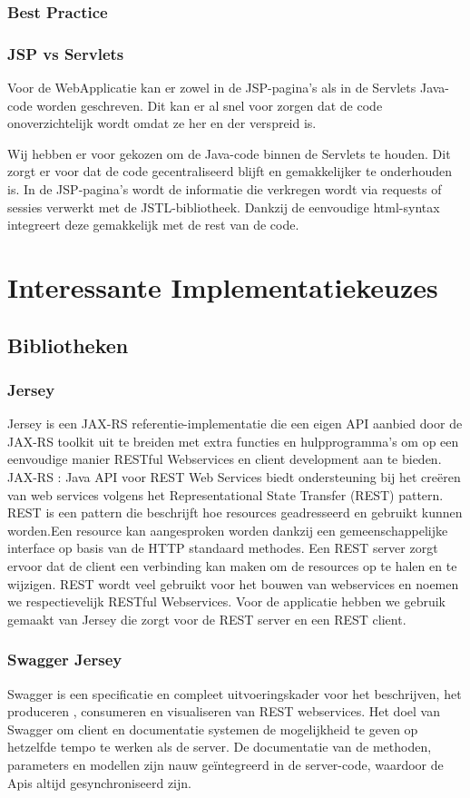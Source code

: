 \documentclass[pdftex,a4paper,12pt,twoside]{report}
\begin{document}
\subsection{Best Practice}
\subsection{JSP vs Servlets}
Voor de WebApplicatie kan er zowel in de JSP-pagina's als in de Servlets Java-code worden geschreven. Dit kan er al snel voor zorgen dat de code onoverzichtelijk wordt omdat ze her en der verspreid is.

Wij hebben er voor gekozen om de Java-code binnen de Servlets te houden. Dit zorgt er voor dat de code gecentraliseerd blijft en gemakkelijker te onderhouden is. In de JSP-pagina's wordt de informatie die verkregen wordt via requests of sessies verwerkt met de JSTL-bibliotheek. Dankzij de eenvoudige html-syntax integreert deze gemakkelijk met de rest van de code.

\chapter{Interessante Implementatiekeuzes}
\section{Bibliotheken}
\subsection{Jersey}

Jersey is een JAX-RS referentie-implementatie die een eigen API aanbied door de JAX-RS toolkit uit te breiden met extra functies en hulpprogramma's om op een eenvoudige manier RESTful Webservices en client development aan te bieden.
JAX-RS : Java API voor REST Web Services biedt ondersteuning bij het creëren van web services volgens het Representational State Transfer (REST) pattern.
REST is een pattern die beschrijft hoe resources geadresseerd en gebruikt kunnen worden.Een resource kan aangesproken worden dankzij een gemeenschappelijke interface op basis van de HTTP standaard methodes.
Een REST server zorgt ervoor dat de client een verbinding kan maken om de resources op te halen en te wijzigen. REST wordt veel gebruikt voor het bouwen van webservices en noemen we respectievelijk RESTful Webservices.
Voor de applicatie hebben we gebruik gemaakt van Jersey die zorgt voor de REST server en een REST client.


\subsection{Swagger Jersey}
Swagger is een specificatie en compleet uitvoeringskader voor het beschrijven, het produceren , consumeren en visualiseren van REST webservices. Het doel van Swagger om client en documentatie systemen de mogelijkheid te geven op hetzelfde tempo te werken als de server. De documentatie van de methoden, parameters en modellen zijn nauw geïntegreerd in de server-code, waardoor de Apis altijd gesynchroniseerd zijn.
\end{document}
